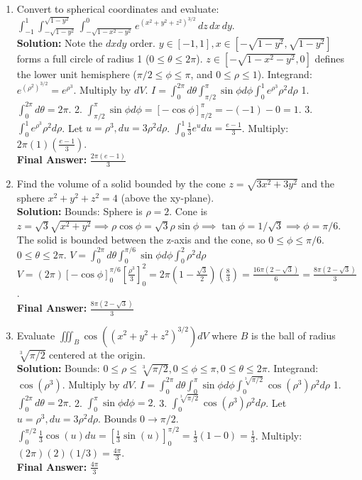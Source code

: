 \documentclass[11pt]{article}
\begin{document}
\begin{enumerate}[label=\textbf{\arabic*.}]
\item Convert to spherical coordinates and evaluate: $\int_{-1}^1 \int_{-\sqrt{1-y^2}}^{\sqrt{1-y^2}} \int_{-\sqrt{1-x^2-y^2}}^0 e^{(x^2+y^2+z^2)^{3/2}} \, dz \, dx \, dy$.\\
\textbf{Solution:}
Note the $dx dy$ order. $y \in [-1, 1], x \in [-\sqrt{1-y^2}, \sqrt{1-y^2}]$ forms a full circle of radius 1 ($0 \le \theta \le 2\pi$). 
$z \in [-\sqrt{1-x^2-y^2}, 0]$ defines the lower unit hemisphere ($\pi/2 \le \phi \le \pi$, and $0 \le \rho \le 1$).
Integrand: $e^{(\rho^2)^{3/2}} = e^{\rho^3}$. Multiply by $dV$.
$I = \int_0^{2\pi} d\theta \int_{\pi/2}^\pi \sin\phi d\phi \int_0^1 e^{\rho^3} \rho^2 d\rho$
1. $\int_0^{2\pi} d\theta = 2\pi$.
2. $\int_{\pi/2}^\pi \sin\phi d\phi = [-\cos\phi]_{\pi/2}^\pi = -(-1) - 0 = 1$.
3. $\int_0^1 e^{\rho^3} \rho^2 d\rho$. Let $u=\rho^3, du=3\rho^2 d\rho$. $\int_0^1 \frac{1}{3}e^u du = \frac{e-1}{3}$.
Multiply: $2\pi(1)(\frac{e-1}{3})$.\\
\textbf{Final Answer:} $\frac{2\pi(e-1)}{3}$

\item Find the volume of a solid bounded by the cone $z = \sqrt{3x^2+3y^2}$ and the sphere $x^2+y^2+z^2=4$ (above the xy-plane).\\
\textbf{Solution:}
Bounds: Sphere is $\rho=2$. Cone is $z = \sqrt{3}\sqrt{x^2+y^2} \implies \rho\cos\phi = \sqrt{3}\rho\sin\phi \implies \tan\phi = 1/\sqrt{3} \implies \phi = \pi/6$. 
The solid is bounded between the z-axis and the cone, so $0 \le \phi \le \pi/6$. $0 \le \theta \le 2\pi$.
$V = \int_0^{2\pi} d\theta \int_0^{\pi/6} \sin\phi d\phi \int_0^2 \rho^2 d\rho$
$V = (2\pi) [-\cos\phi]_0^{\pi/6} [\frac{\rho^3}{3}]_0^2 = 2\pi (1 - \frac{\sqrt{3}}{2}) (\frac{8}{3}) = \frac{16\pi(2-\sqrt{3})}{6} = \frac{8\pi(2-\sqrt{3})}{3}$.\\
\textbf{Final Answer:} $\frac{8\pi(2-\sqrt{3})}{3}$

\item Evaluate $\iiint_B \cos\left((x^2+y^2+z^2)^{3/2}\right) dV$ where $B$ is the ball of radius $\sqrt[3]{\pi/2}$ centered at the origin.\\
\textbf{Solution:}
Bounds: $0 \le \rho \le \sqrt[3]{\pi/2}, 0 \le \phi \le \pi, 0 \le \theta \le 2\pi$.
Integrand: $\cos(\rho^3)$. Multiply by $dV$.
$I = \int_0^{2\pi} d\theta \int_0^\pi \sin\phi d\phi \int_0^{\sqrt[3]{\pi/2}} \cos(\rho^3) \rho^2 d\rho$
1. $\int_0^{2\pi} d\theta = 2\pi$.
2. $\int_0^\pi \sin\phi d\phi = 2$.
3. $\int_0^{\sqrt[3]{\pi/2}} \cos(\rho^3)\rho^2 d\rho$. Let $u=\rho^3, du=3\rho^2 d\rho$. Bounds $0 \to \pi/2$. 
$\int_0^{\pi/2} \frac{1}{3}\cos(u)du = [\frac{1}{3}\sin(u)]_0^{\pi/2} = \frac{1}{3}(1 - 0) = \frac{1}{3}$.
Multiply: $(2\pi)(2)(1/3) = \frac{4\pi}{3}$.\\
\textbf{Final Answer:} $\frac{4\pi}{3}$


\end{enumerate}
\end{document}
